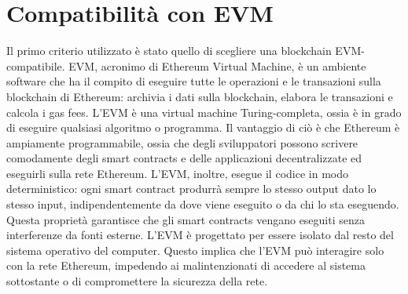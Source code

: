 \documentclass[12pt]{report}
\begin{document}
\section{Compatibilità con EVM}
\label{sec:EVM}
Il primo criterio utilizzato è stato quello di scegliere una blockchain EVM-compatibile.\newline
EVM, acronimo di Ethereum Virtual Machine, è un ambiente software che ha il compito di eseguire tutte le operazioni e le transazioni sulla blockchain di Ethereum: archivia i dati sulla blockchain, elabora le transazioni e calcola i gas fees.\newline
L'EVM è una virtual machine Turing-completa, ossia è in grado di eseguire qualsiasi algoritmo o programma. Il vantaggio di ciò è che Ethereum è ampiamente programmabile, ossia che degli sviluppatori possono scrivere comodamente degli smart contracts e delle applicazioni decentralizzate ed eseguirli sulla rete Ethereum.\newline
L'EVM, inoltre, esegue il codice in modo deterministico: ogni smart contract produrrà sempre lo stesso output dato lo stesso input, indipendentemente da dove viene eseguito o da chi lo sta eseguendo. Questa proprietà garantisce che gli smart contracts vengano eseguiti senza interferenze da fonti esterne.\newline
L'EVM è progettato per essere isolato dal resto del sistema operativo del computer. Questo implica che l'EVM può interagire solo con la rete Ethereum, impedendo ai malintenzionati di accedere al sistema sottostante o di compromettere la sicurezza della rete.\newpage
\end{document}

